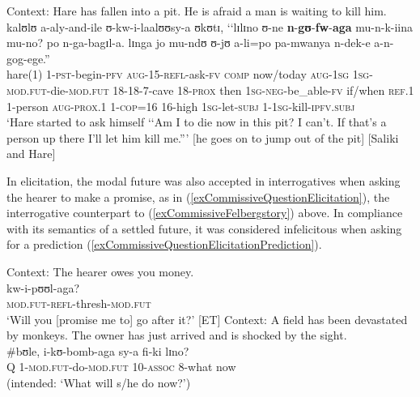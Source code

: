 \begin{exe}
\ex\label{exModalFutureRhetoricalQuestion2}
Context: Hare has fallen into a pit. He is afraid a man is waiting to kill him.\\
\gll kalʊlʊ a-aly-and-ile ʊ-kw-i-laalʊʊsy-a ʊkʊtɪ, \textup{\lq\lq}lɪlɪno ʊ-ne \textbf{n}-\textbf{gʊ}-\textbf{fw}-\textbf{aga} mu-n-k-iina mu-no? po n-ga-bagɪl-a. lɪnga jo mu-ndʊ ʊ-jʊ a-li=po pa-mwanya n-dek-e a-n-gog-ege.\textup{''}\\
hare(1) 1-\textsc{pst}-begin-\textsc{pfv} \textsc{aug}-15-\textsc{refl}-ask-\textsc{fv} \textsc{comp} \phantom{\lq\lq}now/today \textsc{aug}-\textsc{1sg} \textsc{1sg}-\textsc{mod.fut}-die-\textsc{mod.fut} 18-18-7-cave 18-\textsc{prox} then \textsc{1sg}-\textsc{neg}-be\_able-\textsc{fv} if/when \textsc{ref.1} 1-person \textsc{aug}-\textsc{prox.1} 1-\textsc{cop}=16 16-high \textsc{1sg}-let-\textsc{subj} 1-\textsc{1sg}-kill-\textsc{ipfv.subj}\\
\glt \lq Hare started to ask himself \lq\lq Am I to die now in this pit? I can't. If that's a person up there I'll let him kill me.''{}' [he goes on to jump out of the pit] [Saliki and Hare]
\end{exe}

In elicitation, the modal future was also accepted in interrogatives when asking the hearer to make a promise, as in (\ref{exCommissiveQuestionElicitation}), the interrogative counterpart to (\ref{exCommissiveFelbergstory}) above. In compliance with its semantics of a settled future, it was considered infelicitous when asking for a prediction (\ref{exCommissiveQuestionElicitationPrediction}).

\pagebreak %

\begin{exe}
\ex \label{exCommissiveQuestionElicitation}Context: The hearer owes you money.\\
\gll kw-i-pʊʊl-aga?\\
\textsc{mod.fut}-\textsc{refl}-thresh-\textsc{mod.fut}\\
\glt \lq Will you [promise me to] go after it?' [ET]
\ex \label{exCommissiveQuestionElicitationPrediction} Context: A field has been devastated by monkeys. The owner has just arrived and is shocked by the sight.\\
\gll \#bʊle, i-kʊ-bomb-aga sy-a fi-ki lɪno?\\
\phantom{\#}Q 1-\textsc{mod.fut}-do-\textsc{mod.fut} 10-\textsc{assoc} 8-what now\\
\glt \makebox[\myl][l]{}(intended: \lq What will s/he do now?')
\end{exe} 
